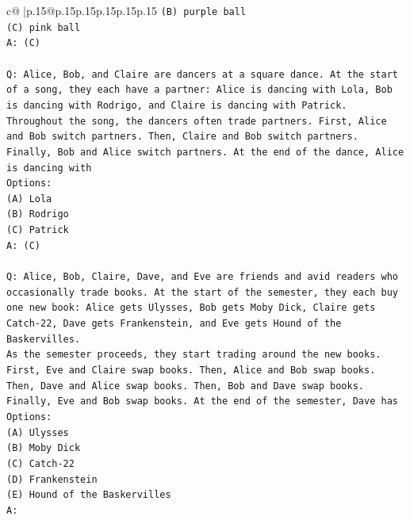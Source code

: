 \documentclass{article}
\begin{document}
{\begin{supertabular}{c@{$\;$}|p{.15\linewidth}@{}p{.15\linewidth}p{.15\linewidth}p{.15\linewidth}p{.15\linewidth}p{.15\linewidth}}
{{{\texttt{(B) purple ball} \\
\texttt{(C) pink ball} \\
\texttt{A: (C)} \\
\\ 
\texttt{Q: Alice, Bob, and Claire are dancers at a square dance. At the start of a song, they each have a partner: Alice is dancing with Lola, Bob is dancing with Rodrigo, and Claire is dancing with Patrick.} \\
\texttt{Throughout the song, the dancers often trade partners. First, Alice and Bob switch partners. Then, Claire and Bob switch partners. Finally, Bob and Alice switch partners. At the end of the dance, Alice is dancing with} \\
\texttt{Options:} \\
\texttt{(A) Lola} \\
\texttt{(B) Rodrigo} \\
\texttt{(C) Patrick} \\
\texttt{A: (C)} \\
\\ 
\texttt{Q: Alice, Bob, Claire, Dave, and Eve are friends and avid readers who occasionally trade books. At the start of the semester, they each buy one new book: Alice gets Ulysses, Bob gets Moby Dick, Claire gets Catch{-}22, Dave gets Frankenstein, and Eve gets Hound of the Baskervilles.} \\
\texttt{As the semester proceeds, they start trading around the new books. First, Eve and Claire swap books. Then, Alice and Bob swap books. Then, Dave and Alice swap books. Then, Bob and Dave swap books. Finally, Eve and Bob swap books. At the end of the semester, Dave has} \\
\texttt{Options:} \\
\texttt{(A) Ulysses} \\
\texttt{(B) Moby Dick} \\
\texttt{(C) Catch{-}22} \\
\texttt{(D) Frankenstein} \\
\texttt{(E) Hound of the Baskervilles} \\
\texttt{A:} \\
            }
        }
    }
     \\ \\


\end{supertabular}}
\end{document}

